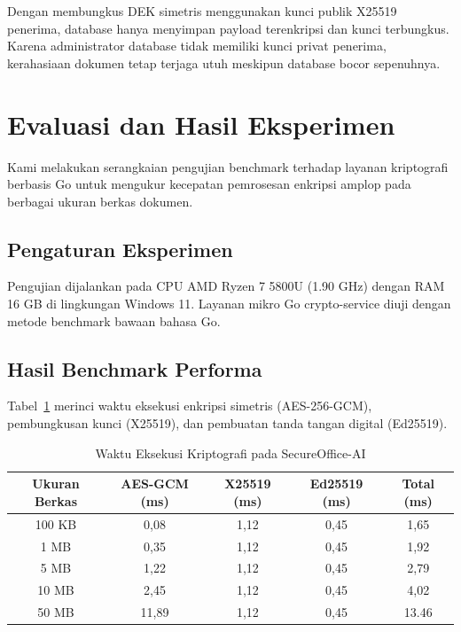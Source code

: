 \documentclass[conference]{IEEEtran}
\begin{document}
Dengan membungkus DEK simetris menggunakan kunci publik X25519 penerima, database hanya menyimpan payload terenkripsi dan kunci terbungkus. Karena administrator database tidak memiliki kunci privat penerima, kerahasiaan dokumen tetap terjaga utuh meskipun database bocor sepenuhnya.

\section{Evaluasi dan Hasil Eksperimen}
Kami melakukan serangkaian pengujian benchmark terhadap layanan kriptografi berbasis Go untuk mengukur kecepatan pemrosesan enkripsi amplop pada berbagai ukuran berkas dokumen.

\subsection{Pengaturan Eksperimen}
Pengujian dijalankan pada CPU AMD Ryzen 7 5800U (1.90 GHz) dengan RAM 16 GB di lingkungan Windows 11. Layanan mikro Go crypto-service diuji dengan metode benchmark bawaan bahasa Go.

\subsection{Hasil Benchmark Performa}
Tabel~\ref{tab:benchmarks} merinci waktu eksekusi enkripsi simetris (AES-256-GCM), pembungkusan kunci (X25519), dan pembuatan tanda tangan digital (Ed25519).

\begin{table}[htbp]
\caption{Waktu Eksekusi Kriptografi pada SecureOffice-AI}
\begin{center}
\begin{tabular}{ccccc}
\toprule
\textbf{Ukuran Berkas} & \textbf{AES-GCM (ms)} & \textbf{X25519 (ms)} & \textbf{Ed25519 (ms)} & \textbf{Total (ms)} \\
\midrule
100 KB  & 0,08 & 1,12 & 0,45 & 1,65 \\
1 MB    & 0,35 & 1,12 & 0,45 & 1,92 \\
5 MB    & 1,22 & 1,12 & 0,45 & 2,79 \\
10 MB   & 2,45 & 1,12 & 0,45 & 4,02 \\
50 MB   & 11,89 & 1,12 & 0,45 & 13.46 \\
\bottomrule
\end{tabular}
\label{tab:benchmarks}
\end{center}
\end{table}
\end{document}
